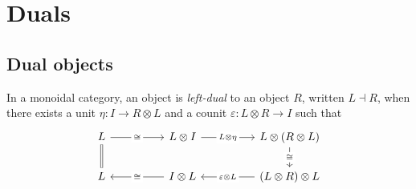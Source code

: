 \documentclass{article}
\begin{document}
\section{Duals}\label{sec:duals}

\subsection{Dual objects}\label{sec:dual_objects}

\begin{definition}
  In a monoidal category, an object is \emph{left-dual} to an object $R$, written $L\dashv R$,
  when there exists a unit $\eta:I\to R\otimes L$ and a counit $\varepsilon : L\otimes R\to I$
  such that
  \begin{equation}
    \begin{tikzcd}
      L && {L\otimes I} && {L\otimes(R\otimes L)} \\
      L && {I\otimes L} && {(L\otimes R)\otimes L}
      \arrow["\cong"{description}, from=1-1, to=1-3]
      \arrow["\cong"{description}, from=1-5, to=2-5]
      \arrow["\cong"{description}, from=2-3, to=2-1]
      \arrow["L\otimes\eta"{description}, from=1-3, to=1-5]
      \arrow["{\varepsilon\otimes L}"{description}, from=2-5, to=2-3]
      \arrow[Rightarrow, no head, from=1-1, to=2-1]
    \end{tikzcd}
  \end{equation}
\end{definition}
\end{document}
